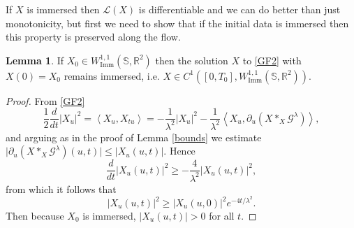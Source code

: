 \documentclass[a4paper,11pt]{amsart}
\theoremstyle{definition}\newtheorem*{definition}{Definition}
\theoremstyle{definition} \newtheorem{proposition}[theorem]{Proposition}
\theoremstyle{definition}\newtheorem{lemma}[theorem]{Lemma}
\theoremstyle{definition}\newtheorem{corollary}[theorem]{Corollary}
\theoremstyle{definition}\newtheorem{example}{Example}
\theoremstyle{remark}\newtheorem*{remark}{Remark}
\def\R{\mathbb{R}}
\def\S{\mathbb{S}}
\newcommand{\ip}[1]{{\left \langle {#1} \right \rangle}}
\DeclareMathOperator{\imm}{Imm}
\def\length{\mathcal L}
\def\wimm{W^{1,1}_{\imm}(\S,\R^2)}
\begin{document}
If $X$ is immersed then $\length(X)$ is differentiable and we can do better than just monotonicity, but first we need to show that if the initial data is immersed then this property is preserved along the flow. 

\begin{lemma}
\label{PRimmersed}
    If $X_0\in \wimm$ then the solution $X$ to \eqref{GF2} with $X(0)=X_0$ remains immersed, i.e.  $X\in C^1([0,T_0],\wimm)$. 
\end{lemma}
\begin{proof}
From \eqref{GF2}
\[
\frac{1}{2} \frac{d}{dt}|X_u|^2=\ip{X_u,X_{tu}}=-\frac{1}{\lambda^2}|X_u|^2-\frac{1}{\lambda^2}\ip{X_u,\partial_u(X\ast_X\mathcal{G}^\lambda)},
\]
and arguing as in the proof of Lemma \ref{bounds} we estimate $\big|\partial_u(X\ast_X\mathcal G^\lambda)(u,t)\big|\leq |X_u(u,t)| $. 
Hence
\[
\frac{d}{dt}|X_u(u,t)|^2\geq-\frac{4}{\lambda^2}|X_u(u,t)|^2,
\]
from which it follows that
\begin{equation}\label{immersionbound}
 |X_u(u,t)|^2\geq |X_u(u,0)|^2e^{-4t/\lambda^2}.   
\end{equation}
Then because $X_0$ is immersed, $|X_u(u,t)|>0$ for all $t$.
\end{proof}
\end{document}
